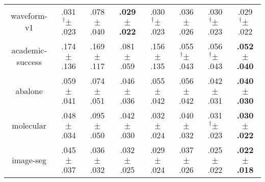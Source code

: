 \begin{tabular}{|c|ccccccc|}
waveform-v1 & .031$^{\dag}\pm^{\phantom{\dag}}$.023\cellcolor{green!36} & .078$^{\phantom{\dag}}\pm^{\phantom{\dag}}$.040\cellcolor{red!40} & \textbf{.029$^{\phantom{\dag}}\pm^{\phantom{\dag}}$.022}\cellcolor{green!40} & .030$^{\dag}\pm^{\phantom{\dag}}$.023\cellcolor{green!38} & .036$^{\phantom{\dag}}\pm^{\phantom{\dag}}$.026\cellcolor{green!28} & .030$^{\dag}\pm^{\phantom{\dag}}$.023\cellcolor{green!37} & .029$^{\dag}\pm^{\phantom{\dag}}$.022\cellcolor{green!38} \\
academic-success & .174$^{\phantom{\dag}}\pm^{\phantom{\dag}}$.136\cellcolor{red!40} & .169$^{\phantom{\dag}}\pm^{\phantom{\dag}}$.117\cellcolor{red!36} & .081$^{\phantom{\dag}}\pm^{\phantom{\dag}}$.059\cellcolor{green!20} & .156$^{\phantom{\dag}}\pm^{\phantom{\dag}}$.135\cellcolor{red!28} & .055$^{\dag}\pm^{\phantom{\dag}}$.043\cellcolor{green!38} & .056$^{\dag}\pm^{\phantom{\dag}}$.043\cellcolor{green!37} & \textbf{.052$^{\phantom{\dag}}\pm^{\phantom{\dag}}$.040}\cellcolor{green!40} \\
abalone & .059$^{\phantom{\dag}}\pm^{\phantom{\dag}}$.041\cellcolor{red!5} & .074$^{\phantom{\dag}}\pm^{\phantom{\dag}}$.051\cellcolor{red!40} & .046$^{\phantom{\dag}}\pm^{\phantom{\dag}}$.036\cellcolor{green!24} & .055$^{\phantom{\dag}}\pm^{\phantom{\dag}}$.042\cellcolor{green!4} & .056$^{\phantom{\dag}}\pm^{\phantom{\dag}}$.042\cellcolor{green!2} & .042$^{\phantom{\dag}}\pm^{\phantom{\dag}}$.031\cellcolor{green!34} & \textbf{.040$^{\phantom{\dag}}\pm^{\phantom{\dag}}$.030}\cellcolor{green!40} \\
molecular & .048$^{\phantom{\dag}}\pm^{\phantom{\dag}}$.034\cellcolor{green!18} & .095$^{\phantom{\dag}}\pm^{\phantom{\dag}}$.050\cellcolor{red!40} & .042$^{\phantom{\dag}}\pm^{\phantom{\dag}}$.030\cellcolor{green!25} & .032$^{\phantom{\dag}}\pm^{\phantom{\dag}}$.024\cellcolor{green!37} & .040$^{\phantom{\dag}}\pm^{\phantom{\dag}}$.032\cellcolor{green!27} & .031$^{\dag}\pm^{\phantom{\dag}}$.023\cellcolor{green!39} & \textbf{.030$^{\phantom{\dag}}\pm^{\phantom{\dag}}$.022}\cellcolor{green!40} \\
image-seg & .045$^{\phantom{\dag}}\pm^{\phantom{\dag}}$.037\cellcolor{red!40} & .036$^{\phantom{\dag}}\pm^{\phantom{\dag}}$.032\cellcolor{red!6} & .032$^{\phantom{\dag}}\pm^{\phantom{\dag}}$.025\cellcolor{green!6} & .029$^{\phantom{\dag}}\pm^{\phantom{\dag}}$.024\cellcolor{green!17} & .037$^{\phantom{\dag}}\pm^{\phantom{\dag}}$.026\cellcolor{red!10} & .025$^{\phantom{\dag}}\pm^{\phantom{\dag}}$.022\cellcolor{green!30} & \textbf{.022$^{\phantom{\dag}}\pm^{\phantom{\dag}}$.018}\cellcolor{green!40} \\

\end{tabular}
